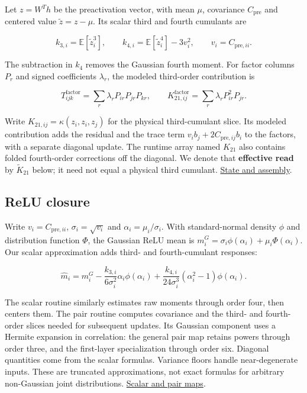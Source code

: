 \documentclass[11pt,letterpaper]{article}
\begin{document}
Let \(z=W^T h\) be the preactivation vector, with mean \(\mu\), covariance \(C_{\mathrm{pre}}\) and centered value \(\widetilde z=z-\mu\). Its scalar third and fourth cumulants are

\begin{equation}
k_{3,i}=\mathbb E[\widetilde z_i^3],\qquad
k_{4,i}=\mathbb E[\widetilde z_i^4]-3v_i^2,\qquad v_i=C_{\mathrm{pre},ii}.
\end{equation}

The subtraction in \(k_4\) removes the Gaussian fourth moment. For factor columns \(P_r\) and signed coefficients \(\lambda_r\), the modeled third-order contribution is

\begin{equation}
T^{\mathrm{factor}}_{ijk}=\sum_r\lambda_rP_{ir}P_{jr}P_{kr},\qquad
K^{\mathrm{factor}}_{21,ij}=\sum_r\lambda_rP_{ir}^2P_{jr}.
\end{equation}

Write \(K_{21,ij}=\kappa(z_i,z_i,z_j)\) for the physical third-cumulant slice. Its modeled contribution adds the residual and the trace term \(v_i b_j+2C_{\mathrm{pre},ij}b_i\) to the factors, with a separate diagonal update. The runtime array named \(K_{21}\) also contains folded fourth-order corrections off the diagonal. We denote that \textbf{effective read} by \(\widetilde K_{21}\) below; it need not equal a physical third cumulant. \href{https://github.com/mattliston/arc-whitebox-estimation-challenge/blob/main/estimator/ANATOMY.md\#carried-state-and-linear-transport}{State and assembly}.

\subsection{ReLU closure}\label{relu-closure}

Write \(v_i=C_{\mathrm{pre},ii}\), \(\sigma_i=\sqrt{v_i}\) and \(\alpha_i=\mu_i/\sigma_i\). With standard-normal density \(\phi\) and distribution function \(\Phi\), the Gaussian ReLU mean is \(m_i^G=\sigma_i\phi(\alpha_i)+\mu_i\Phi(\alpha_i)\). Our scalar approximation adds third- and fourth-cumulant responses:

\begin{equation}
\widehat m_i=m_i^G
-\frac{k_{3,i}}{6\sigma_i^2}\alpha_i\phi(\alpha_i)
+\frac{k_{4,i}}{24\sigma_i^3}(\alpha_i^2-1)\phi(\alpha_i).
\end{equation}

The scalar routine similarly estimates raw moments through order four, then centers them. The pair routine computes covariance and the third- and fourth-order slices needed for subsequent updates. Its Gaussian component uses a Hermite expansion in correlation: the general pair map retains powers through order three, and the first-layer specialization through order six. Diagonal quantities come from the scalar formulas. Variance floors handle near-degenerate inputs. These are truncated approximations, not exact formulas for arbitrary non-Gaussian joint distributions. \href{https://github.com/mattliston/arc-whitebox-estimation-challenge/blob/main/estimator/ANATOMY.md\#relu-moment-closure}{Scalar and pair maps}.
\end{document}
